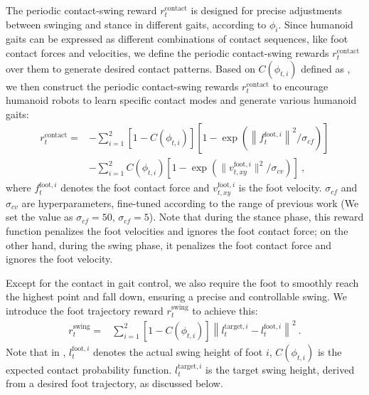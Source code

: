 The periodic contact-swing reward $r_t^{\text{contact}}$ is designed for precise adjustments between swinging and stance in different gaits, according to $\phi_i$. 
Since humanoid gaits can be expressed as different combinations of contact sequences, like foot contact forces and velocities, we define the periodic contact-swing rewards $r^{\text{contact}}_t$ over them to generate desired contact patterns.
Based on $C(\phi_{t,i})$ defined as , we then construct the periodic contact-swing rewards $r_t^{\text{contact}}$ to encourage humanoid robots to learn specific contact modes and generate various humanoid gaits:
\begin{equation}
\begin{aligned}
r_t^{\text{contact}} = & -\sum_{i=1}^{2} [1-C(\phi_{t,i})]\left[1-\exp\left(\left \|  f^{\text{foot}, i}_t \right \|^2 / \sigma_{cf} \right)\right] \\
& -\sum_{i=1}^{2} C(\phi_{t,i})\left[1-\exp\left(\| v^{\text{foot}, i}_{t, xy} \|^2 / \sigma_{cv} \right)\right]~,
\end{aligned}
\end{equation}
where $f_t^{\text{foot}, i}$ denotes the foot contact force and $v^{\text{foot}, i}_{t, xy}$ is the foot velocity. $\sigma_{cf}$ and $\sigma_{cv}$ are hyperparameters, fine-tuned according to the range of previous work \citep{margolis2022walktheseways} (We set the value as $\sigma_{cf}=50$, $\sigma_{cf}=5$). Note that during the stance phase, this reward function penalizes the foot velocities and ignores the foot contact force; on the other hand, during the swing phase, it penalizes the foot contact force and ignores the foot velocity.

Except for the contact in gait control, we also require the foot to smoothly reach the highest point and fall down, ensuring a precise and controllable swing. We introduce the foot trajectory reward $r_t^{\text{swing}}$ to achieve this:
\begin{equation}\label{eq:foot_traj}
\begin{aligned}
r_t^{\text{swing}} = & \sum_{i=1}^2 [1-C(\phi_{t,i})]\left \| l_t^{\text{target}, i} - l_t^{\text{foot},i} \right \|^2~.
\end{aligned}
\end{equation}
Note that in , $l_t^{\text{foot},i}$ denotes the actual swing height of foot $i$, $C(\phi_{t,i})$ is the expected contact probability function. 
$l_t^{\text{target}, i}$ is the target swing height, derived from a desired foot trajectory, as discussed below.

